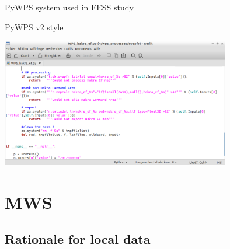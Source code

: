 \documentclass[aspectratio=169,unknownkeysallowed,xcolor=dvipsnames,beamer]{beamer} %
\begin{document}
\begin{frame}[fragile]{PyWPS system used in FESS study}

\begin{block}{PyWPS v2 style}
\begin{center}
\includegraphics[width=10cm]{pywps_hakra}
\end{center}
\end{block}
\end{frame}





\section{MWS}
\subsection{Rationale for local data}
{
\begin{frame}[plain]
\end{frame}}
\end{document}
